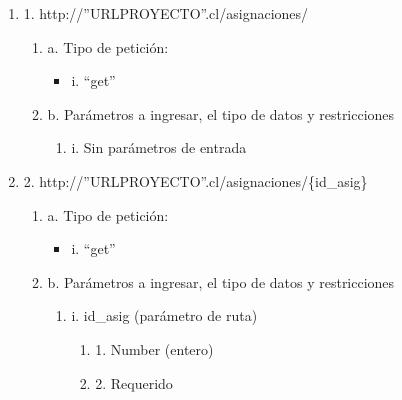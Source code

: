 \begin{enumerate}
    \item 1. http://”URLPROYECTO”.cl/asignaciones/
    \begin{enumerate}
        \item a. Tipo de petición:
            \begin{itemize}
               \item i. “get”
            \end{itemize}
        \item b. Parámetros a ingresar, el tipo de datos y restricciones
            \begin{enumerate}
                \item i. Sin parámetros de entrada
            \end{enumerate}
    \end{enumerate}

    \item 2. http://”URLPROYECTO”.cl/asignaciones/\{id\_asig\}
    \begin{enumerate}
        \item a. Tipo de petición:
            \begin{itemize}
               \item i. “get”
            \end{itemize}
        \item b. Parámetros a ingresar, el tipo de datos y restricciones
            \begin{enumerate}
                \item i. id\_asig (parámetro de ruta)
                    \begin{enumerate}
                        \item 1. Number (entero)
                        \item 2. Requerido
                    \end{enumerate}
            \end{enumerate}
    \end{enumerate}


\end{enumerate}

